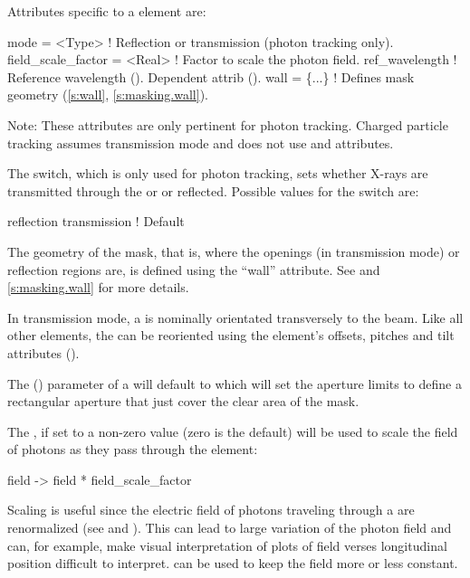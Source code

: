 {
Attributes specific to a  element are:
\begin{example}
  mode               = <Type>   ! Reflection or transmission (photon tracking only).
  field_scale_factor = <Real>   ! Factor to scale the photon field.
  ref_wavelength                ! Reference wavelength (). Dependent attrib ().
  wall               = \{...\}    ! Defines mask geometry (\ref{s:wall}, \ref{s:masking.wall}).

\end{example}

Note: These attributes are only pertinent for photon tracking. Charged
particle tracking assumes transmission mode and does not use
 and  attributes.

The  switch, which is only used for photon tracking, sets
whether X-rays are transmitted through the  or
or reflected. Possible values for the  switch are:
\begin{example}
  reflection
  transmission        ! Default
\end{example}

The geometry of the mask, that is, where the openings (in transmission mode) or reflection regions
are, is defined using the ``wall'' attribute. See  and \ref{s:masking.wall} for more
details.

In transmission mode, a  is nominally orientated transversely to the beam. Like all other
elements, the  can be reoriented using the element's offsets, pitches and tilt attributes
().

The  () parameter of a  will default to  which
will set the aperture limits to define a rectangular aperture that just cover the clear area of the
mask.

The , if set to a non-zero value (zero is the
default) will be used to scale the field of photons as they pass through
the  element:
\begin{example}
  field -> field * field_scale_factor
\end{example}
Scaling is useful since the electric field of photons traveling through a  are renormalized
(see  and ). This can lead to large variation of the photon field and can, for
example, make visual interpretation of plots of field verses longitudinal position difficult to
interpret.  can be used to keep the field more or less constant.

}
